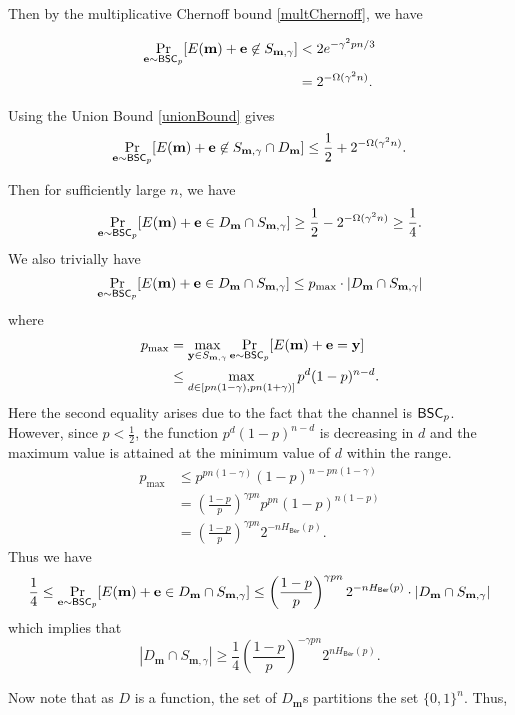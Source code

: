 Then by the multiplicative Chernoff bound \ref{multChernoff}, we have

\begin{align*}
    \Pr_{\textbf{e}\sim\mathsf{BSC}_p}[E(\textbf{m})+\textbf{e}\not\in S_{\textbf{m},\gamma}] &<2e^{-\gamma^2pn/3} \\ 
    &= 2^{-\Omega(\gamma^2n)}.
\end{align*}

Using the Union Bound \ref{unionBound} gives
$$\Pr_{\textbf{e}\sim\mathsf{BSC}_p}[E(\textbf{m})+\textbf{e}\not\in S_{\textbf{m},\gamma}\cap D_{\textbf{m}}]\leq \frac{1}{2}+2^{-\Omega(\gamma^2n)}.$$

Then for sufficiently large $n$, we have
$$\Pr_{\textbf{e}\sim\mathsf{BSC}_p}[E(\textbf{m})+\textbf{e}\in D_{\textbf{m}}\cap S_{\textbf{m},\gamma}]\geq \frac{1}{2}-2^{-\Omega(\gamma^2n)}\geq \frac{1}{4}.$$
We also trivially have
$$\Pr_{\textbf{e}\sim\mathsf{BSC}_p}[E(\textbf{m})+\textbf{e}\in D_{\textbf{m}}\cap S_{\textbf{m},\gamma}]\leq p_\text{max}\cdot|D_\textbf{m}\cap S_{\textbf{m},\gamma}|$$
where
\begin{align*}
    p_\text{max} &= \max_{\textbf{y}\in S_{\textbf{m},\gamma}}\Pr_{\textbf{e}\sim\mathsf{BSC}_p}[E(\textbf{m})+\textbf{e}=\textbf{y}] \\
    &\leq \max_{d\in[pn(1-\gamma), pn(1+\gamma)]}p^d(1-p)^{n-d}.
\end{align*}
Here the second equality arises due to the fact that the channel is $\mathsf{BSC}_p$. However, since $p<\frac{1}{2}$, the function $p^d(1-p)^{n-d}$ is decreasing in $d$ and the maximum value is attained at the minimum value of $d$ within the range.
\begin{align*}
    p_\text{max} &\leq p^{pn(1-\gamma)}(1-p)^{n-pn(1-\gamma)} \\
                 &= \left(\frac{1-p}{p}\right)^{\gamma pn}p^{pn}(1-p)^{n(1-p)} \\
                 &= \left(\frac{1-p}{p}\right)^{\gamma pn}2^{-n H_\mathsf{Ber}(p)}.
\end{align*}
Thus we have
$$\frac{1}{4}\leq \Pr_{\textbf{e}\sim\mathsf{BSC}_p}[E(\textbf{m})+\textbf{e}\in D_{\textbf{m}}\cap S_{\textbf{m},\gamma}]\leq \left(\frac{1-p}{p}\right)^{\gamma pn}2^{-n H_\mathsf{Ber}(p)}\cdot |D_\textbf{m}\cap S_{\textbf{m},\gamma}|$$
which implies that
$$|D_\textbf{m}\cap S_{\textbf{m},\gamma}|\geq \frac{1}{4}\left(\frac{1-p}{p}\right)^{-\gamma pn}2^{n H_\mathsf{Ber}(p)}.$$

Now note that as $D$ is a function, the set of $D_\textbf{m}$s partitions the set $\{0,1\}^n$. Thus,

